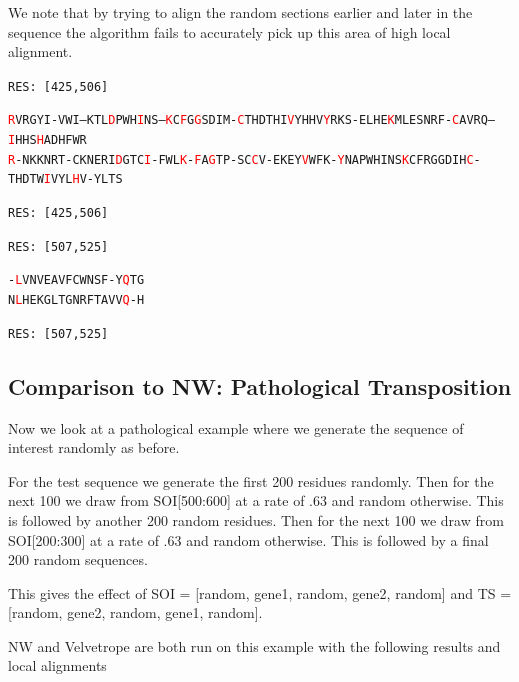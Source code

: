 \documentclass[phd,tocprelim]{cornell}
\begin{document}
We note that by trying to align the random sections earlier and later in the sequence the algorithm fails to accurately pick up this area of high local alignment.

\begin{flushleft}
    \singlespacing
\footnotesize 
\texttt{RES: [425,506]}

\texttt{\textcolor{red}{R}VRGYI-VWI--KTL\textcolor{red}{D}PWH\textcolor{red}{I}NS--\textcolor{red}{K}C\textcolor{red}{F}G\textcolor{red}{G}SDIM-\textcolor{red}{C}THDTHI\textcolor{red}{V}YHHV\textcolor{red}{Y}RKS-ELHE\textcolor{red}{K}MLESNRF-\textcolor{red}{C}AVRQ--\textcolor{red}{I}HHS\textcolor{red}{H}ADHFWR} \\
\texttt{\textcolor{red}{R}-NKKNRT-CKNERI\textcolor{red}{D}GTC\textcolor{red}{I}-FWL\textcolor{red}{K}-\textcolor{red}{F}A\textcolor{red}{G}TP-SC\textcolor{red}{C}V-EKEY\textcolor{red}{V}WFK-\textcolor{red}{Y}NAPWHINS\textcolor{red}{K}CFRGGDIH\textcolor{red}{C}-THDTW\textcolor{red}{I}VYL\textcolor{red}{H}V-YLTS}

\texttt{RES: [425,506]}

\texttt{RES: [507,525]}

\texttt{-\textcolor{red}{L}VNVEAVFCWNSF-Y\textcolor{red}{Q}TG} \\
\texttt{N\textcolor{red}{L}HEKGLTGNRFTAVV\textcolor{red}{Q}-H}

\texttt{RES: [507,525]}

\normalsize
\normalspacing
\end{flushleft}

\subsection{Comparison to NW: Pathological Transposition}

Now we look at a pathological example where we generate the sequence of interest randomly as before.

For the test sequence we generate the first 200 residues randomly. Then for the next 100 we draw from SOI[500:600] at a rate of .63 and random otherwise. This is followed by another 200 random residues. Then for the next 100 we draw from SOI[200:300] at a rate of .63 and random otherwise. This is followed by a final 200 random sequences.

This gives the effect of SOI = [random, gene1, random, gene2, random] and TS = [random, gene2, random, gene1, random].

NW and Velvetrope are both run on this example with the following results and local alignments
\end{document}
